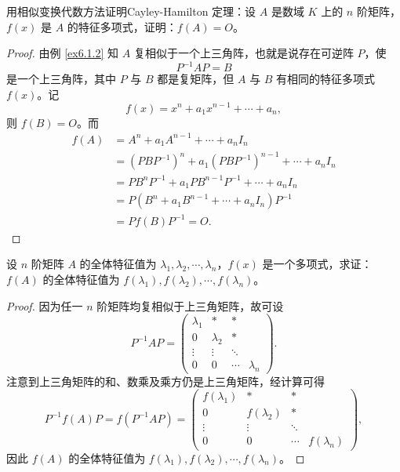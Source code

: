 \documentclass[lang=cn,12pt]{elegantbook}
\begin{document}
\begin{example}
    用相似变换代数方法证明Cayley-Hamilton 定理：设 \( A \) 是数域 \( K \) 上的 \( n \) 阶矩阵，\( f(x) \) 是 \( A \) 的特征多项式，证明：\( f(A) = O \)。
\end{example}

\begin{proof}
    由例 \ref{ex6.1.2} 知 \( A \) 复相似于一个上三角阵，也就是说存在可逆阵 \( P \)，使
    \[
    P^{-1}AP = B
    \]
    是一个上三角阵，其中 \( P \) 与 \( B \) 都是复矩阵，但 \( A \) 与 \( B \) 有相同的特征多项式 \( f(x) \)。记
    \[
    f(x) = x^n + a_1x^{n-1} + \cdots + a_n,
    \]
    则 \( f(B) = O \)。而
    \[
\begin{aligned}
    f(A) &= A^n + a_1A^{n-1} + \cdots + a_nI_n \\
    &= (PBP^{-1})^n + a_1(PBP^{-1})^{n-1} + \cdots + a_nI_n \\
    &= PB^nP^{-1} + a_1PB^{n-1}P^{-1} + \cdots + a_nI_n \\
    &= P(B^n + a_1B^{n-1} + \cdots + a_nI_n)P^{-1} \\
    &= Pf(B)P^{-1} = O.
\end{aligned}
    \]
\end{proof}

\begin{example}\label{ex6.7}
    设 \( n \) 阶矩阵 \( A \) 的全体特征值为 \( \lambda_1, \lambda_2, \cdots, \lambda_n \)，\( f(x) \) 是一个多项式，求证：\( f(A) \) 的全体特征值为 \( f(\lambda_1), f(\lambda_2), \cdots, f(\lambda_n) \)。
\end{example}
    
\begin{proof}
    因为任一 \( n \) 阶矩阵均复相似于上三角矩阵，故可设
    \[
    P^{-1}AP = 
    \begin{pmatrix}
    \lambda_1 & * & * \\
    0 & \lambda_2 & * \\
    \vdots & \vdots & \ddots \\
    0 & 0 & \cdots & \lambda_n
    \end{pmatrix}.
    \]
    注意到上三角矩阵的和、数乘及乘方仍是上三角矩阵，经计算可得
    \[
    P^{-1}f(A)P = f(P^{-1}AP) =
    \begin{pmatrix}
    f(\lambda_1) & * & * \\
    0 & f(\lambda_2) & * \\
    \vdots & \vdots & \ddots \\
    0 & 0 & \cdots & f(\lambda_n)
    \end{pmatrix},
    \]
    因此 \( f(A) \) 的全体特征值为 \( f(\lambda_1), f(\lambda_2), \cdots, f(\lambda_n) \)。
\end{proof}
    
\end{document}
